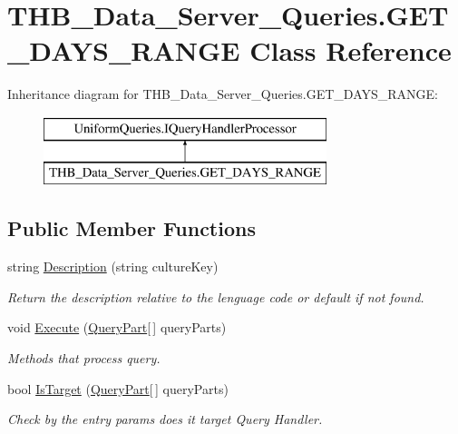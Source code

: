 \hypertarget{class_t_h_b___data___server___queries_1_1_g_e_t___d_a_y_s___r_a_n_g_e}{}\section{T\+H\+B\+\_\+\+Data\+\_\+\+Server\+\_\+\+Queries.\+G\+E\+T\+\_\+\+D\+A\+Y\+S\+\_\+\+R\+A\+N\+GE Class Reference}
\label{class_t_h_b___data___server___queries_1_1_g_e_t___d_a_y_s___r_a_n_g_e}
Inheritance diagram for T\+H\+B\+\_\+\+Data\+\_\+\+Server\+\_\+\+Queries.\+G\+E\+T\+\_\+\+D\+A\+Y\+S\+\_\+\+R\+A\+N\+GE\+:\begin{figure}[H]
\begin{center}
\leavevmode
\includegraphics[height=2.000000cm]{de/de2/class_t_h_b___data___server___queries_1_1_g_e_t___d_a_y_s___r_a_n_g_e}
\end{center}
\end{figure}
\subsection*{Public Member Functions}
\begin{DoxyCompactItemize}
\item 
string \mbox{\hyperlink{class_t_h_b___data___server___queries_1_1_g_e_t___d_a_y_s___r_a_n_g_e_aa91ce7c90a325c70aab9aaf112fe49f3}{Description}} (string culture\+Key)
\begin{DoxyCompactList}\small\item\em Return the description relative to the lenguage code or default if not found. \end{DoxyCompactList}\item 
void \mbox{\hyperlink{class_t_h_b___data___server___queries_1_1_g_e_t___d_a_y_s___r_a_n_g_e_a6c1884577a045fad484de904dc0da636}{Execute}} (\mbox{\hyperlink{struct_uniform_queries_1_1_query_part}{Query\+Part}}\mbox{[}$\,$\mbox{]} query\+Parts)
\begin{DoxyCompactList}\small\item\em Methods that process query. \end{DoxyCompactList}\item 
bool \mbox{\hyperlink{class_t_h_b___data___server___queries_1_1_g_e_t___d_a_y_s___r_a_n_g_e_a1f27cee6dbc3ba3fdfad0590a75d239b}{Is\+Target}} (\mbox{\hyperlink{struct_uniform_queries_1_1_query_part}{Query\+Part}}\mbox{[}$\,$\mbox{]} query\+Parts)
\begin{DoxyCompactList}\small\item\em Check by the entry params does it target Query Handler. \end{DoxyCompactList}\end{DoxyCompactItemize}


